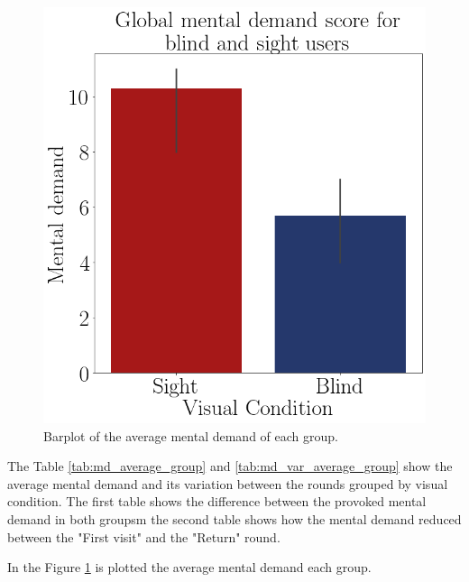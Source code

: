 \begin{figure}[!htb]
\begin{minipage}{.45\linewidth}
        \vspace{1.8cm}
        \centering
        \includegraphics[width = \linewidth]{Resultados/Nasa/Figuras/png/barplot_md_avg_global.png}
        \caption{Barplot of the average mental demand of each group.}
        \label{fig:barplot_md_global}
    \end{minipage}
\end{figure}

The Table \ref{tab:md_average_group} and \ref{tab:md_var_average_group} show the average mental demand and its variation between the rounds grouped by visual condition. The first table shows the difference between the provoked mental demand in both groupsm the second table shows how the mental demand reduced between the "First visit" and the "Return" round.

In the Figure \ref{fig:barplot_md_global} is plotted the average mental demand each group.



